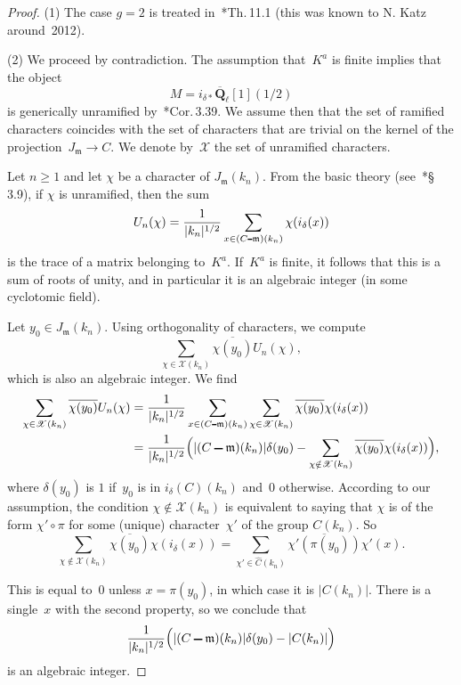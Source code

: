 \documentclass[12pt]{amsart}
\renewcommand{\geq}{\geqslant}
\numberwithin{equation}{section}
\def\setminus{\mathchoice
    {\mathbin{\vrule height .62ex width 1.61ex depth -.38ex}}%
    {\mathbin{\vrule height .62ex width 1.61ex depth -.38ex}}%
    {\mathbin{\vrule height .50ex width 0.85ex depth -.28ex}}%
    {\mathbin{\vrule height .20ex width 0.570ex depth -.24ex}}%
}
\newcommand{\Qq}{\mathbf{Q}}
\newcommand{\bQl}{\overline{\Qq}_{\ell}}
\newcommand{\mfm}{\mathfrak{m}}
\theoremstyle{plain}
\theoremstyle{remark}
\theoremstyle{definition}
\newcommand{\mcX}{\mathscr{X}}
\renewcommand{\geq}{\geqslant}
\begin{document}
\begin{proof}
  (1) The case $g=2$ is treated in~\cite{ffk}*{Th.\,11.1} (this was
  known to N. Katz around~2012).

  (2) We proceed by contradiction. The assumption that~$K^a$ is finite
  implies that the object 
  \[
  M=i_{\delta*}\bQl[1](1/2)
  \] is generically
  unramified by~\cite{ffk}*{Cor.\,3.39}.  We assume then that the set of
  ramified characters coincides with the set of characters that are
  trivial on the kernel of the projection~$J_{\mfm}\to C$. We denote
  by~$\mcX$ the set of unramified characters.

  Let $n\geq 1$ and let $\chi$ be a character of $J_{\mfm}(k_n)$. From
  the basic theory (see~\cite{ffk}*{\S\,3.9}), if $\chi$ is unramified,
  then the sum
  \[
    U_n(\chi)=\frac{1}{|k_n|^{1/2}}\sum_{x\in (C\setminus
      \mfm)(k_n)}\chi(i_{\delta}(x))
  \]
  is the trace of a matrix belonging to~$K^a$.  If~$K^a$ is finite, it
  follows that this is a sum of roots of unity, and in particular it is
  an algebraic integer (in some cyclotomic field).
 
  Let $y_0\in J_{\mfm}(k_n)$. Using orthogonality of characters, we
  compute
  \[
    \sum_{\chi\in\mcX(k_n)}\overline{\chi(y_0)}U_n(\chi),
  \]
  which is also an algebraic integer. We find
  \begin{align*}
    \sum_{\chi\in \mcX(k_n)}\overline{\chi(y_0)}U_n(\chi) &=
    \frac{1}{|k_n|^{1/2}}\sum_{x\in (C\setminus\mfm)(k_n)}
    \sum_{\chi\in\mcX(k_n)}\overline{\chi(y_0)}\chi(i_{\delta}(x))
    \\
    &= \frac{1}{|k_n|^{1/2}}\Bigl( |(C\setminus\mfm)(k_n)|\delta(y_0)-
    \sum_{\chi\notin\mcX(k_n)}\overline{\chi(y_0)}\chi(i_{\delta}(x)) \Bigr), 
  \end{align*}
  where $\delta(y_0)$ is $1$ if~$y_0$ is in $i_{\delta}(C)(k_n)$ and~$0$
  otherwise. According to our assumption, the condition
  $\chi\notin\mcX(k_n)$ is equivalent to saying that $\chi$ is of the
  form $\chi'\circ \pi$ for some (unique) character~$\chi'$ of the group
  $C(k_n)$. So
  \[
    \sum_{\chi\notin\mcX(k_n)}\overline{\chi(y_0)}\chi(i_{\delta}(x))=
    \sum_{\chi'\in \widehat{C}(k_n)}\overline{\chi'(\pi(y_0))}\chi'(x).
  \]

  This is equal to~$0$ unless $x=\pi(y_0)$, in which case it is
  $|C(k_n)|$. There is a single~$x$ with the second property, so we
  conclude that
  \[
    \frac{1}{|k_n|^{1/2}}\Bigl( |(C\setminus
    \mfm)(k_n)|\delta(y_0)-|C(k_n)| \Bigr)
  \]
  is an algebraic integer.


\end{proof}
\end{document}
